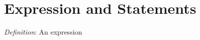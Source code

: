 \documentclass[../main.tex]{subfiles}
\begin{document}
    \section{Expression and Statements}
    \emph{Definition}: An expression
\end{document}
